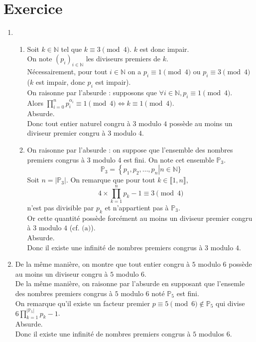 \documentclass{report}
\begin{document}
\setcounter{section}{9}
\section{Exercice}
\begin{enumerate}
    \item \begin{enumerate}
        \item Soit $k \in \mathbb{N}$ tel que $k \equiv 3 \pmod{4}$. $k$ est donc impair. \\
        On note $(p_i)_{i \in \mathbb{N}}$ les diviseurs premiers de $k$. \\
        Nécessairement, pour tout $i \in \mathbb{N}$ on a $p_i \equiv 1 \pmod{4}$ ou $p_i \equiv 3 \pmod{4}$ ($k$ est impair, donc $p_i$ est impair). \\
        On raisonne par l'absurde : supposons que $\forall i \in \mathbb{N}, p_i \equiv 1 \pmod{4}$. \\ 
        Alors $\prod\limits_{i = 0}^{n} p_i^{\alpha_i} \equiv 1 \pmod{4} \Leftrightarrow k \equiv 1 \pmod{4}$. \\
        Absurde. \\
        Donc tout entier naturel congru à $3$ modulo $4$ possède au moins un diviseur premier congru à $3$ modulo $4$. 

        \item On raisonne par l'absurde : on suppose que l'ensemble des nombres premiers congrus à $3$ modulo $4$ est fini. On note cet ensemble $\mathbb{P}_3$. 
        $$\mathbb{P}_3 = \left\{ p_1, p_2, \ldots, p_n \right | n \in \mathbb{N} \}$$
        Soit $n = |\mathbb{P}_3|$. 
        On remarque que pour tout $k \in \llbracket 1, n \rrbracket$, 
        $$4 \times \prod_{k=1}^{n} p_k - 1 \equiv 3 \pmod{4}$$
        n'est pas divisible par $p_k$ et n'appartient pas à $\mathbb{P}_3$. \\
        Or cette quantité possède forcément au moins un diviseur premier congru à $3$ modulo $4$ (cf. $\text{(a)}$). \\
        Absurde. \\
        Donc il existe une infinité de nombres premiers congrus à $3$ modulo $4$. 
    \end{enumerate}

    \item De la même manière, on montre que tout entier congru à $5$ modulo $6$ possède au moins un diviseur congru à $5$ modulo $6$. \\
    De la même manière, on raisonne par l'absurde en supposant que l'ensemle des nombres premiers congrus à $5$ modulo $6$ noté $\mathbb{P}_5$ est fini. \\
    On remarque qu'il existe un facteur premier $p \equiv 5 \pmod{6} \not \in \mathbb{P}_5$ qui divise $6 \prod\limits_{k = 1}^{|\mathbb{P}_5|} p_k - 1$. \\
    Absurde. \\ 
    Donc il existe une infinité de nombres premiers congrus à $5$ modulos $6$. 
\end{enumerate}
\end{document}
